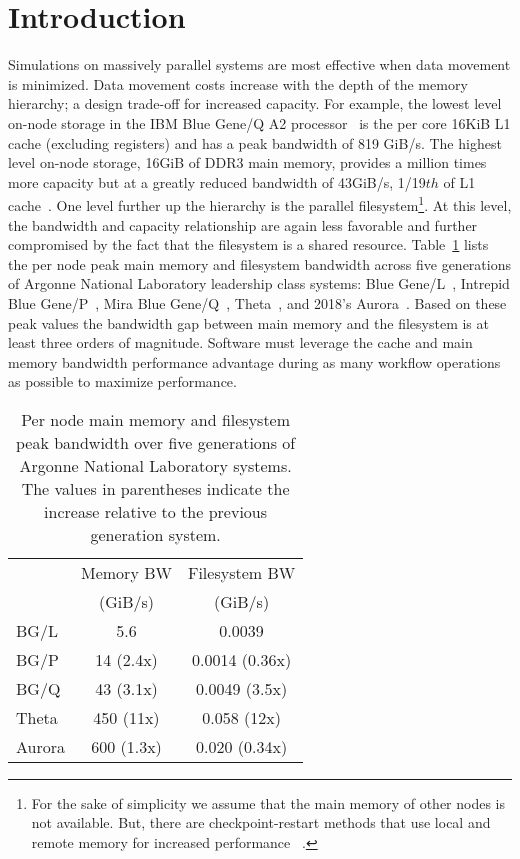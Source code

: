 \section{Introduction}

Simulations on massively parallel systems are most effective when data
movement is minimized.
Data movement costs increase with the depth of the memory hierarchy; a design
trade-off for increased capacity.
For example, the lowest level on-node storage in the IBM Blue Gene/Q A2
processor~\cite{haring2012ibm} is the per core 16KiB L1 cache (excluding
registers) and has a peak bandwidth of 819 GiB/s.
The highest level on-node storage, 16GiB of DDR3 main memory, provides a million
times more capacity but at a greatly reduced bandwidth of 43GiB/s,
1/19$th$ of L1 cache~\cite{lo2014roofline}.
One level further up the hierarchy is the parallel filesystem\footnote{For the
sake of simplicity we assume that the main memory of other nodes is not
available.
But, there are checkpoint-restart methods that use local and remote memory for
increased performance
~\cite{rma-fault-tolerance-2014,compression-cr-2012}.
}.
At this level, the bandwidth and capacity relationship are again less favorable
and further compromised by the fact that the filesystem is a shared resource.
Table~\ref{tbl:systems} lists the per node peak main memory and filesystem
bandwidth across five generations of Argonne National Laboratory leadership
class systems: Blue Gene/L~\cite{yu2006high,adiga2002overview}, Intrepid
Blue Gene/P~\cite{lang2009performance,alam2008early}, Mira
Blue Gene/Q~\cite{haring2012ibm,bui2014scalable},
Theta~\cite{knl,jeffers2016intel}, and 2018's Aurora~\cite{aurorafacts}.
Based on these peak values the bandwidth gap between main memory and the
filesystem is at least three orders of magnitude.
Software must leverage the cache and main memory bandwidth performance advantage
during as many workflow operations as possible to maximize performance.

\begin{table}[h] \centering
  \caption[
  Per node main memory and filesystem peak bandwidth over five
  generations of Argonne National Laboratory systems.
  ]{Per node main memory and filesystem peak bandwidth over five
  generations of Argonne National Laboratory systems.
  The values in parentheses indicate the increase relative to
  the previous generation system.}
\label{tbl:systems}
\begin{tabular}{l|cc}
        & Memory BW  & Filesystem BW \\
        & (GiB/s)    & (GiB/s)    \\
 \hline
 BG/L   & 5.6        & 0.0039         \\
 BG/P   & 14 (2.4x)  & 0.0014 (0.36x)   \\
 BG/Q   & 43 (3.1x)  & 0.0049 (3.5x) \\
 Theta  & 450 (11x)  & 0.058 (12x) \\
 Aurora & 600 (1.3x) & 0.020 (0.34x)
\end{tabular}
\end{table}

